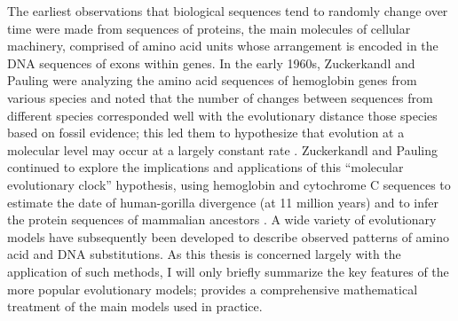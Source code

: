 The earliest observations that biological sequences tend to randomly
change over time were made from sequences of proteins, the main
molecules of cellular machinery, comprised of amino acid units whose
arrangement is encoded in the DNA sequences of exons within genes. In
the early 1960s, Zuckerkandl and Pauling were analyzing the amino acid
sequences of hemoglobin genes from various species and noted that the
number of changes between sequences from different species
corresponded well with the evolutionary distance those species based
on fossil evidence; this led them to hypothesize that evolution at a
molecular level may occur at a largely constant rate
\citep{Zuckerkandl1962,Morgan1998}. Zuckerkandl and Pauling continued
to explore the implications and applications of this ``molecular
evolutionary clock'' hypothesis, using hemoglobin and cytochrome C
sequences to estimate the date of human-gorilla divergence (at 11
million years) and to infer the protein sequences of mammalian
ancestors \citep{Zuckerkandl1965}. A wide variety of evolutionary
models have subsequently been developed to describe observed patterns
of amino acid and DNA substitutions. As this thesis is concerned
largely with the application of such methods, I will only briefly
summarize the key features of the more popular evolutionary models;
\citet{Yang2006} provides a comprehensive mathematical treatment of
the main models used in practice.


